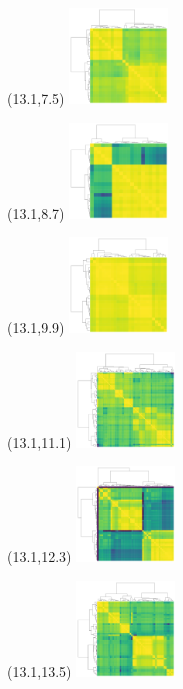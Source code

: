 \documentclass{article}
\begin{document}
\begin{textblock}{1}(13.1,7.5)  \includegraphics[height=1in]{main-figure-assets/clustermaps/14qtel_1-500K_1_12_12_rc.pdf} \end{textblock}
\begin{textblock}{1}(13.1,8.7)  \includegraphics[height=1in]{main-figure-assets/clustermaps/chr15.pdf}                    \end{textblock}
\begin{textblock}{1}(13.1,9.9)  \includegraphics[height=1in]{main-figure-assets/clustermaps/18qtel_1-500K_1_12_12_rc.pdf} \end{textblock}
\begin{textblock}{1}(13.1,11.1) \includegraphics[height=1in]{main-figure-assets/clustermaps/chr21.pdf}                    \end{textblock}
\begin{textblock}{1}(13.1,12.3) \includegraphics[height=1in]{main-figure-assets/clustermaps/chr22.pdf}                    \end{textblock}
\begin{textblock}{1}(13.1,13.5) \includegraphics[height=1in]{main-figure-assets/clustermaps/chrX.pdf}                     \end{textblock}
\end{document}
